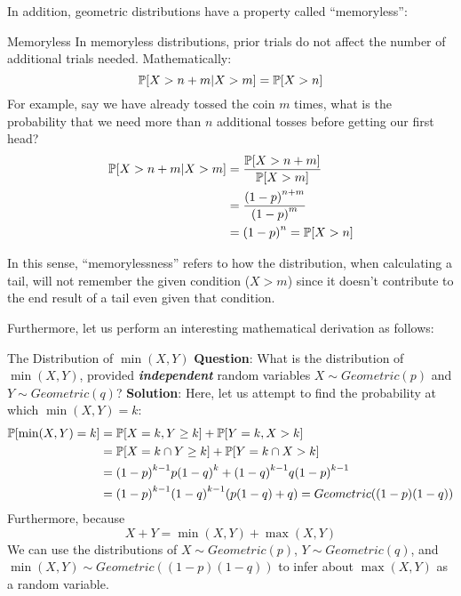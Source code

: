 In addition, geometric distributions have a property called ``memoryless'':
\begin{ln-define}{Memoryless}{}
    In memoryless distributions, prior trials do not affect the number of additional trials needed. Mathematically:
    \[\P[X > n + m | X > m] = \P[X > n]\]
    For example, say we have already tossed the coin $m$ times, what is the probability that we need more than $n$ additional tosses before getting our first head?
    \begin{align*}
        \P[X > n + m | X > m]
        &= \frac{\P[X > n + m]}{\P[X > m]} \\
        &= \frac{{(1 - p)}^{n + m}}{{(1 - p)}^m} \\
        &= {(1 - p)}^n = \P[X > n]
    \end{align*}
\end{ln-define}
In this sense, ``memorylessness'' refers to how the distribution, when calculating a tail, will not remember the given condition ($X > m$) since it doesn't contribute to the end result of a tail even given that condition.

Furthermore, let us perform an interesting mathematical derivation as follows:
\begin{ln-practice}{The Distribution of $\min(X, Y)$}{}
    \textbf{Question}: What is the distribution of $\min(X, Y)$, provided \textit{\textbf{independent}} random variables $X \sim Geometric(p)$ and $Y \sim Geometric(q)$?
    \tcblower
    \textbf{Solution}:
    Here, let us attempt to find the probability at which $\min(X, Y) = k$:
    \begin{align*}
        \P[\min(X, Y) = k]
        &= \P[X = k, Y \geq k] + \P[Y = k, X > k] \\
        &= \P[X = k \cap Y \geq k] + \P[Y = k \cap X > k] \\
        &= {(1 - p)}^{k - 1} p {(1 - q)}^k + {(1 - q)}^{k - 1} q {(1 - p)}^{k - 1} \\
        &= {(1 - p)}^{k - 1}{(1 - q)}^{k - 1} (p(1 - q) + q) = Geometric((1 - p)(1 - q))
    \end{align*}
    Furthermore, because
    \[X + Y = \min(X, Y) + \max(X, Y)\]
    We can use the distributions of $X \sim Geometric(p)$, $Y \sim Geometric(q)$, and $\min(X, Y) \sim Geometric((1 - p)(1 - q))$ to infer about $\max(X, Y)$ as a random variable.
\end{ln-practice}

